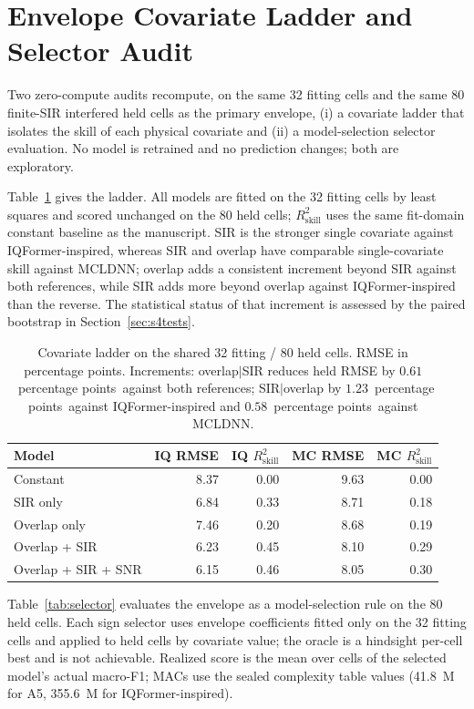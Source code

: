 \documentclass[letterpaper,onecolumn,11pt,journal]{IEEEtran}
\newcommand{\pp}{percentage points}
\begin{document}
\section{Envelope Covariate Ladder and Selector Audit}
Two zero-compute audits recompute, on the same 32 fitting cells and the same
80 finite-SIR interfered held cells as the primary envelope, (i) a covariate
ladder that isolates the skill of each physical covariate and (ii) a
model-selection selector evaluation. No model is retrained and no prediction
changes; both are exploratory.

Table~\ref{tab:ladder} gives the ladder. All models are fitted on the 32
fitting cells by least squares and scored unchanged on the 80 held cells;
$R^2_{\mathrm{skill}}$ uses the same fit-domain constant baseline as the
manuscript. SIR is the stronger single covariate against IQFormer-inspired,
whereas SIR and overlap have comparable single-covariate skill against
MCLDNN; overlap adds a consistent increment beyond SIR against both
references, while SIR adds more beyond overlap against IQFormer-inspired
than the reverse. The statistical status of that increment is assessed by the
paired bootstrap in Section~\ref{sec:s4tests}.

\begin{table}[t]
\centering
\caption{Covariate ladder on the shared 32 fitting / 80 held cells. RMSE in
\pp. Increments: overlap$|$SIR reduces held RMSE by $0.61$~\pp\ against both
references; SIR$|$overlap by $1.23$~\pp\ against IQFormer-inspired and
$0.58$~\pp\ against MCLDNN.}
\label{tab:ladder}
\footnotesize
\setlength{\tabcolsep}{4pt}
\begin{tabular}{lrrrr}
\toprule
Model & IQ RMSE & IQ $R^2_{\mathrm{skill}}$ & MC RMSE & MC $R^2_{\mathrm{skill}}$\\
\midrule
Constant & 8.37 & 0.00 & 9.63 & 0.00\\
SIR only & 6.84 & 0.33 & 8.71 & 0.18\\
Overlap only & 7.46 & 0.20 & 8.68 & 0.19\\
Overlap + SIR & 6.23 & 0.45 & 8.10 & 0.29\\
Overlap + SIR + SNR & 6.15 & 0.46 & 8.05 & 0.30\\
\bottomrule
\end{tabular}
\end{table}

Table~\ref{tab:selector} evaluates the envelope as a model-selection rule on
the 80 held cells. Each sign selector uses envelope coefficients fitted only
on the 32 fitting cells and applied to held cells by covariate value; the
oracle is a hindsight per-cell best and is not achievable. Realized score is
the mean over cells of the selected model's actual macro-F1; MACs use the
sealed complexity table values (41.8~M for A5, 355.6~M for IQFormer-inspired).
\end{document}
